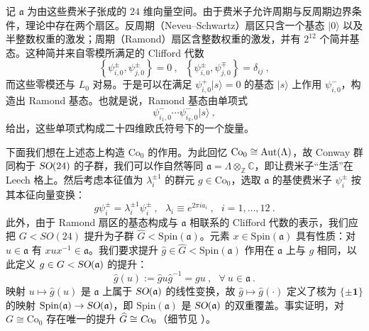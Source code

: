 记 $\mathfrak{a}$ 为由这些费米子张成的 $24$ 维向量空间。由于费米子允许周期与反周期边界条件，理论中存在两个扇区。反周期（Neveu–Schwartz）扇区只含一个基态 $|0\rangle$ 以及半整数权重的激发；周期（Ramond）扇区含整数权重的激发，并有 $2^{12}$ 个简并基态。这种简并来自零模所满足的 Clifford 代数
\begin{equation}
\left\lbrace\psi^\pm_{i,0},\psi^\pm_{j,0}\right\rbrace=0~,~~~\left\lbrace\psi^\pm_{i,0},\psi^\mp_{j,0}\right\rbrace=\delta_{ij}~,
\end{equation}
而这些零模还与 $L_0$ 对易。于是可以在满足 $\psi^+_{i,0}|s\rangle=0$ 的基态 $|s\rangle$ 上作用 $\psi^-_{i,0}$，构造出 Ramond 基态。也就是说，Ramond 基态由单项式
\begin{equation}
\label{eq:conway_mononomials}
\psi^-_{i_1,0}\cdots\psi^-_{i_k,0}|s\rangle~,
\end{equation}
给出，这些单项式构成二十四维欧氏符号下的一个旋量。


下面我们想在上述态上构造 $\text{Co}_0$ 的作用。为此回忆 $\text{Co}_0\cong\operatorname{\text{Aut}}(\Lambda)$，故 Conway 群同构于 $\operatorname{\textsl{SO}}(24)$ 的子群，我们可以作自然等同 $\mathfrak{a}=\Lambda\otimes_\mathbb{Z}\mathbb{C}$，即让费米子“生活”在 Leech 格上。然后考虑本征值为 $\lambda_i^{\pm1}$ 的群元 $g\in\text{Co}_0$，选取 $\mathfrak{a}$ 的基使费米子 $\psi^\pm_i$ 按其本征向量变换：
\begin{equation}
\label{eq:conway_action_fermions}
g\psi^\pm_i=\lambda_i^{\pm1}\psi^\pm_i~,~~~\lambda_i\equiv e^{2\pi ia_i}~,~~~i=1,\dots,12~.
\end{equation}
此外，由于 Ramond 扇区的基态构成与 $\mathfrak{a}$ 相联系的 Clifford 代数的表示，我们应把 $G<SO(24)$ 提升为子群 $\widehat{G}<\text{Spin}(\mathfrak{a})$。元素 $x\in\text{Spin}(\mathfrak{a})$ 具有性质：对 $u\in\mathfrak{a}$ 有 $xux^{-1}\in\mathfrak{a}$。我们要求提升 $\hat{g}\in\widehat{G}<\text{Spin}(\mathfrak{a})$ 作用在 $\mathfrak{a}$ 上与 $g$ 相同，以此定义 $g\in G<\operatorname{\textsl{SO}}(\mathfrak{a})$ 的提升：
\begin{equation}
\label{lift_def}
\hat{g}(u):=\hat{g}u\hat{g}^{-1}=gu
~,~~~\forall~u\in\mathfrak{a}~.
\end{equation}
映射 $u\mapsto\hat{g}(u)$ 是 $\mathfrak{a}$ 上属于 $\operatorname{\textsl{SO}}(\mathfrak{a})$ 的线性变换，故 $\hat{g}\mapsto\hat{g}(\cdot)$ 定义了核为 $\lbrace\pm\mathbf{1}\rbrace$ 的映射 $\text{Spin}(\mathfrak{a})\rightarrow\operatorname{\textsl{SO}}(\mathfrak{a})$，即 $\text{Spin}(\mathfrak{a})$ 是 $\operatorname{\textsl{SO}}(\mathfrak{a})$ 的双重覆盖。事实证明，对 $G\cong\text{Co}_0$ 存在唯一的提升 $\widehat{G}\cong\operatorname{\textsl{Co}}_0$（细节见 \cite{DuncanJohnf.r.2015TMMF}）。

